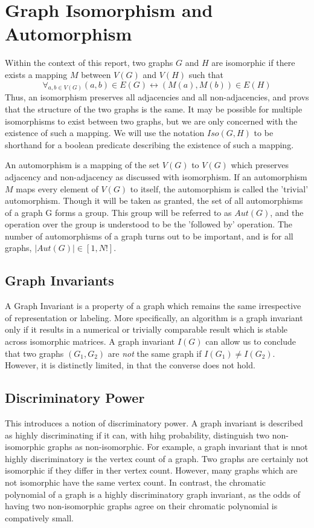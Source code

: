 \documentclass[11pt,a4paper]{report}
\begin{document}
\section{Graph Isomorphism and Automorphism}
Within the context of this report, two graphs $G$ and $H$ are isomorphic if there exists a mapping $M$ between $V(G)$ and $V(H)$ such that $$\forall_{a, b \in V(G)} (a, b) \in E(G) \leftrightarrow (M(a), M(b)) \in E(H)$$
Thus, an isomorphism preserves all adjacencies and all non-adjacencies, and provs that the structure of the two graphs is the same.
It may be possible for multiple isomorphisms to exist between two graphs, but we are only concerned with the existence of such a mapping.
We will use the notation $Iso(G, H)$ to be shorthand for a boolean predicate describing the existence of such a mapping.

An automorphism is a mapping of the set $V(G)$ to $V(G)$ which preserves adjacency and non-adjacency as discussed with isomorphism.
If an automorphism $M$ maps every element of $V(G)$ to itself, the automorphism is called the 'trivial' automorphism.
Though it will be taken as granted, the set of all automorphisms of a graph G forms a group.
This group will be referred to as $Aut(G)$, and the operation over the group is understood to be the 'followed by' operation.
The number of automorphisms of a graph turns out to be important, and is for all graphs, $|Aut(G)| \in [1, N!]$.

\subsection{Graph Invariants}
A Graph Invariant is a property of a graph which remains the same irrespective of representation or labeling.
More specifically, an algorithm is a graph invariant only if it results in a numerical or trivially comparable result which is stable across isomorphic matrices.
A graph invariant $I(G)$ can allow us to conclude that two graphs $(G_1, G_2)$ are \emph{not} the same graph if $I(G_1) \neq I(G_2)$.
However, it is distinctly limited, in that the converse does not hold.

\subsection{Discriminatory Power}
This introduces a notion of discriminatory power.
A graph invariant is described as highly discriminating if it can, with hihg probability, distinguish two non-isomorphic graphs as non-isomorphic.
For example, a graph invariant that is nnot highly discriminatory is the vertex count of a graph.
Two graphs are certainly not isomorphic if they differ in ther vertex count.
However, many graphs which are not isomorphic have the same vertex count.
In contrast, the chromatic polynomial of a graph is a highly discriminatory graph invariant, as the odds of having two non-isomorphic graphs agree on their chromatic polynomial is compatively small.
\end{document}
